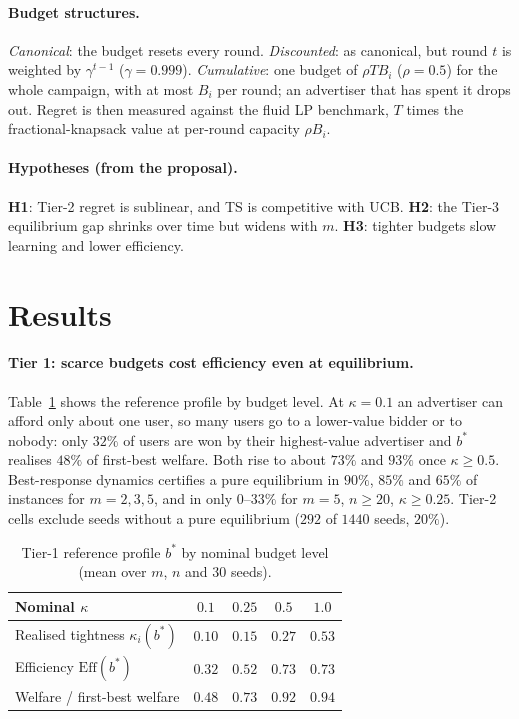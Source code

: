 \documentclass[11pt]{article}
\theoremstyle{remark}
\newcommand{\Eff}{\mathrm{Eff}}
\begin{document}
\paragraph{Budget structures.} \emph{Canonical}: the budget resets every round. \emph{Discounted}: as
canonical, but round $t$ is weighted by $\gamma^{t-1}$ ($\gamma=0.999$). \emph{Cumulative}: one budget of
$\rho TB_i$ ($\rho=0.5$) for the whole campaign, with at most $B_i$ per round; an advertiser that has spent
it drops out. Regret is then measured against the fluid LP benchmark, $T$ times the fractional-knapsack
value at per-round capacity $\rho B_i$.

\paragraph{Hypotheses (from the proposal).} \textbf{H1}: Tier-2 regret is sublinear, and TS is competitive with UCB.
\textbf{H2}: the Tier-3 equilibrium gap shrinks over time but widens with $m$.
\textbf{H3}: tighter budgets slow learning and lower efficiency.

\section{Results}\label{sec:results}

\paragraph{Tier 1: scarce budgets cost efficiency even at equilibrium.} Table~\ref{tab:t1} shows the
reference profile by budget level. At $\kappa=0.1$ an advertiser can afford only about one user,
so many users go to a lower-value bidder or to nobody: only $32\%$ of users are won by their
highest-value advertiser and $b^*$ realises $48\%$ of first-best welfare. Both rise to about $73\%$ and
$93\%$ once $\kappa\ge0.5$. Best-response dynamics certifies a pure equilibrium in $90\%$, $85\%$ and
$65\%$ of instances for $m=2,3,5$, and in only $0$--$33\%$ for $m=5$, $n\ge20$, $\kappa\ge0.25$. Tier-2
cells exclude seeds without a pure equilibrium ($292$ of $1440$ seeds, $20\%$).

\begin{table}[t]
\centering\small
\caption{Tier-1 reference profile $b^*$ by nominal budget level (mean over $m$, $n$ and $30$ seeds).}
\label{tab:t1}
\begin{tabular}{@{}lcccc@{}}
\toprule
Nominal $\kappa$ & $0.1$ & $0.25$ & $0.5$ & $1.0$\\
\midrule
Realised tightness $\kappa_i(b^*)$ & $0.10$ & $0.15$ & $0.27$ & $0.53$\\
Efficiency $\Eff(b^*)$ & $0.32$ & $0.52$ & $0.73$ & $0.73$\\
Welfare / first-best welfare & $0.48$ & $0.73$ & $0.92$ & $0.94$\\
\bottomrule
\end{tabular}
\end{table}
\end{document}
